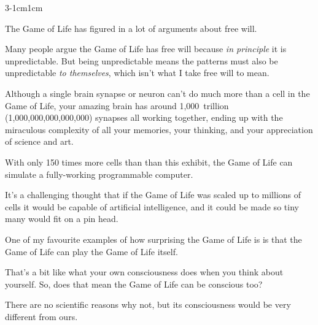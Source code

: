 \documentclass{article}
\begin{document}
\begin{adjmulticols}{3}{-1cm}{1cm}
\newcolumn
{}


The Game of Life has figured in a lot of arguments about free will. 

\in Many people argue the Game of Life has free will because \emph{in principle\/} it is unpredictable. But being unpredictable means the patterns must also be unpredictable \emph{to themselves}, which isn't what I take free will to mean.

\in Although a single brain synapse or neuron can't do much more than a cell in the Game of Life, your amazing brain has around 1,000~trillion (1,000,000,000,000,000) synapses all working together, ending up with the miraculous complexity of all your memories, your thinking, and your appreciation of science and art.

\newcolumn
\in  With only 150 times more cells than than this exhibit, the Game of Life can simulate 
a fully-working programmable computer.

\in It's a challenging thought that if the Game of Life was scaled up to millions of cells it would be capable of artificial intelligence, and it could be made so tiny  many would fit on a pin head.

\in One of my favourite examples of how surprising the Game of Life is is that the Game of Life can play the Game of Life itself. 

\in That's a bit like what your own consciousness does when you think about yourself. So, does that mean the Game of Life can be conscious too? 

\in There are no scientific reasons why not, but its consciousness would be very different from ours.

\vskip 1cm\noindent{}

\newcolumn{}



\end{adjmulticols}
\end{document}
